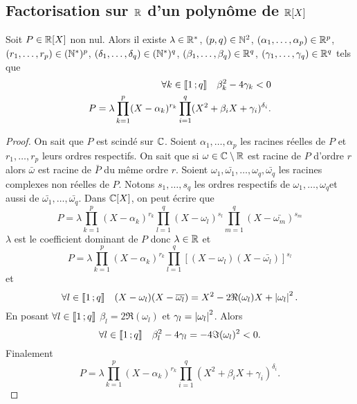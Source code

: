 \subsection{Factorisation sur \(\mathbb{R}\) d'un polynôme de \(\mathbb{R}[X]\)}

\begin{theo}
  Soit \(P \in \mathbb{R}[X]\) non nul. Alors il existe \(\lambda \in \mathbb{R}^*\), \((p,q) \in \mathbb{N}^2\), \((\alpha_1, \ldots, \alpha_p) \in \mathbb{R}^p\), \((r_1, \ldots, r_p) \in (\mathbb{N}^*)^p\), \((\delta_1, \ldots, \delta_q) \in (\mathbb{N}^*)^q\), \((\beta_1, \ldots, \beta_q) \in \mathbb{R}^q\), \((\gamma_1, \ldots, \gamma_q) \in \mathbb{R}^q\) tels que
  \begin{align}
    \forall k \in \mathopen{\llbracket}1\mathclose{}\mathpunct{};q\mathclose{\rrbracket} \quad \beta_k^2 - 4\gamma_k <0\\
    P = \lambda \prod_{k=1}^p (X-\alpha_k)^{r_k} \prod_{i=1}^q(X^2+\beta_i X+\gamma_i)^{\delta_i}.
  \end{align}
\end{theo}
\begin{proof}
  On sait que \(P\) est scindé sur \(\mathbb{C}\). Soient \(\alpha_1, \ldots, \alpha_p\) les racines réelles de \(P\) et \(r_1, \ldots, r_p\) leurs ordres respectifs. On sait que si \(\omega \in \mathbb{C}\setminus\mathbb{R}\) est racine de \(P\) d'ordre \(r\) alors \(\bar{\omega}\) est racine de \(\bar{P}\) du même ordre \(r\).
  Soient \(\omega_1, \bar{\omega_1}, \ldots, \omega_q, \bar{\omega_q}\) les racines complexes non réelles de \(P\). 
  Notons \(s_1, \ldots, s_q\) les ordres respectifs de \(\omega_1, \ldots, \omega_q\)et aussi de \(\bar{\omega_1}, \ldots, \bar{\omega_q}\). Dans \(\mathbb{C}[X]\), on peut écrire que
  \begin{equation}
    P=\lambda \prod_{k=1}^p (X-\alpha_k)^{r_k} \prod_{l=1}^q (X-\omega_l)^{s_l} \prod_{m=1}^q (X-\bar{\omega_m})^{s_m}
  \end{equation}
  \(\lambda\) est le coefficient dominant de \(P\) donc \(\lambda \in \mathbb{R}\) et
  \begin{equation}
    P = \lambda \prod_{k=1}^p (X-\alpha_k)^{r_k} \prod_{l=1}^q [(X-\omega_l)(X-\bar{\omega_l})]^{s_l}
  \end{equation}
  et 
  \begin{equation}
    \forall l \in \mathopen{\llbracket}1\mathclose{}\mathpunct{};q\mathclose{\rrbracket} \quad (X-\omega_l)(X-\overline{\omega_l}) = X^2 -2\Re(\omega_l)X + \left\lvert\omega_l\right\rvert^2.
  \end{equation}
  En posant \(\forall l \in \mathopen{\llbracket}1\mathclose{}\mathpunct{};q\mathclose{\rrbracket}\) \(\beta_l = 2\Re(\omega_l)\) et \(\gamma_l = \left\lvert\omega_l\right\rvert^2\). Alors
  \begin{equation}
    \forall l \in \mathopen{\llbracket}1\mathclose{}\mathpunct{};q\mathclose{\rrbracket} \quad \beta_l^2 -4\gamma_l = -4\Im(\omega_l)^2 < 0.
  \end{equation}
  Finalement
  \begin{equation}
    P = \lambda \prod_{k=1}^p (X-\alpha_k)^{r_k} \prod_{i=1}^q(X^2+\beta_i X+\gamma_i)^{\delta_i}.
  \end{equation}
\end{proof}

